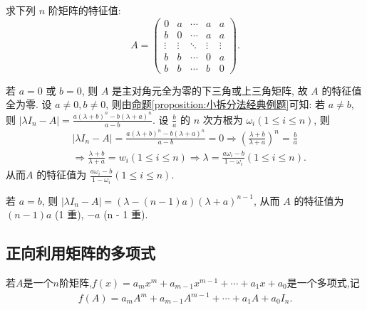 \documentclass[../../main.tex]{subfiles}
\begin{document}
\begin{example}
求下列 $n$ 阶矩阵的特征值:
\[
A = \begin{pmatrix}
0 & a & \cdots & a & a \\
b & 0 & \cdots & a & a \\
\vdots & \vdots & \ddots & \vdots & \vdots \\
b & b & \cdots & 0 & a \\
b & b & \cdots & b & 0
\end{pmatrix}.
\]
\end{example}
\begin{solution}
若 $a = 0$ 或 $b = 0$, 则 $A$ 是主对角元全为零的下三角或上三角矩阵, 故 $A$ 的特征值全为零. 设 $a \neq 0, b \neq 0$, 则由\hyperref[proposition:小拆分法经典例题]{命题\ref{proposition:小拆分法经典例题}}可知:
若 $a \neq b$, 则 $|\lambda I_n-A|=\frac{a(\lambda +b)^n-b(\lambda +a)^n}{a-b}$. 设 $\frac{b}{a}$ 的 $n$ 次方根为 $\omega_i (1 \leq i \leq n)$, 则
\begin{align*}
&|\lambda I_n-A|=\frac{a(\lambda +b)^n-b(\lambda +a)^n}{a-b}=0\Rightarrow \left( \frac{\lambda +b}{\lambda +a} \right) ^n=\frac{b}{a}
\\
&\Rightarrow \frac{\lambda +b}{\lambda +a}=w_i\left( 1\le i\le n \right) \Rightarrow \lambda =\frac{a\omega _i-b}{1-\omega _i}(1\le i\le n).
\end{align*}
从而$A$ 的特征值为 $\frac{a \omega_i - b}{1 - \omega_i} (1 \leq i \leq n)$.

若 $a = b$, 则 $|\lambda I_n - A| = (\lambda - (n - 1)a)(\lambda + a)^{n-1}$, 从而 $A$ 的特征值为 $(n - 1)a$ (1 重), $-a$ (n - 1 重). 
\end{solution}

\subsection{正向利用矩阵的多项式}

\begin{definition}[矩阵多项式]
若$A$是一个$n$阶矩阵,$f(x) = a_m x^m + a_{m-1} x^{m-1} + \cdots + a_1 x + a_0$是一个多项式,记
\begin{align*}
f(A) = a_m A^m + a_{m-1} A^{m-1} + \cdots + a_1 A + a_0 I_n.
\end{align*}
\end{definition}
\end{document}
